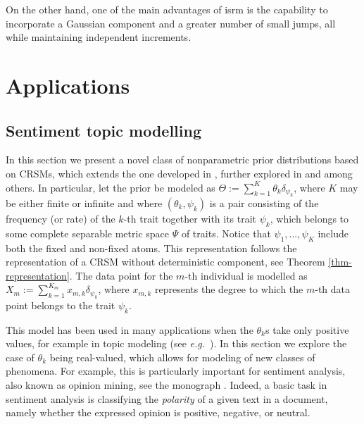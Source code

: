 \documentclass{article}
\theoremstyle{plain}
\theoremstyle{remark}
\begin{document}
On the other hand, one of the main advantages of isrm is the capability to incorporate a Gaussian component and a greater number of small jumps, all while maintaining independent increments.
\section{Applications}\label{Sec-applications}
\subsection{Sentiment topic modelling}\label{Sec-Bay}
In this section we present a novel class of nonparametric prior distributions based on CRSMs, which extends the one developed in \citet{Bro1}, further explored in \citet{Bro2} and \citet{PassRM} among others. In particular, let the prior be modeled as $\Theta:=\sum_{k=1}^{K}\theta_{k}\delta_{\psi_{k}}$, where $K$ may be either finite or infinite and where $(\theta_{k},\psi_{k})$ is a pair consisting of the frequency (or rate) of the $k$-th trait together with its trait $\psi_{k}$, which belongs to some complete separable metric space $\Psi$ of traits. Notice that $\psi_{1},...,\psi_{K}$ include both the fixed and non-fixed atoms. This representation follows the representation of a CRSM without deterministic component, see Theorem \ref{thm-representation}. The data point for the $m$-th individual is modelled as $X_{m}:=\sum_{k=1}^{K_{m}}x_{m,k}\delta_{\psi_{k}}$,
where $x_{m,k}$ represents the degree to which the $m$-th data point belongs to the trait $\psi_{k}$.

This model has been used in many applications when the $\theta_{k}$s take only positive values, for example in topic modeling (see \textit{e.g.}~\citet{Bro1,Bro2,topic-modelling}). In this section we explore the case of $\theta_{k}$ being real-valued, which allows for modeling of new classes of phenomena. For example, this is particularly important for sentiment analysis, also known as opinion mining, see the monograph \citet{liu}. Indeed, a basic task in sentiment analysis is classifying the \textit{polarity} of a given text in a document, namely whether the expressed opinion is positive, negative, or neutral.
\end{document}
